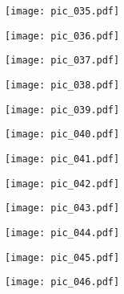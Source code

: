\documentclass[12pt,a4paper]{article}
\begin{document}
\newpage
\bigtitle
\begin{figure}[H]
\texttt{[image: pic\_035.pdf]}
\end{figure}

\newpage
\bigtitle
\begin{figure}[H]
\texttt{[image: pic\_036.pdf]}
\end{figure}

\newpage
\bigtitle
\begin{figure}[H]
\texttt{[image: pic\_037.pdf]}
\end{figure}

\newpage
\bigtitle
\begin{figure}[H]
\texttt{[image: pic\_038.pdf]}
\end{figure}

\newpage
\bigtitle
\begin{figure}[H]
\texttt{[image: pic\_039.pdf]}
\end{figure}

\newpage
\bigtitle
\begin{figure}[H]
\texttt{[image: pic\_040.pdf]}
\end{figure}

\newpage
\bigtitle
\begin{figure}[H]
\texttt{[image: pic\_041.pdf]}
\end{figure}

\newpage
\bigtitle
\begin{figure}[H]
\texttt{[image: pic\_042.pdf]}
\end{figure}

\newpage
\bigtitle
\begin{figure}[H]
\texttt{[image: pic\_043.pdf]}
\end{figure}

\newpage
\bigtitle
\begin{figure}[H]
\texttt{[image: pic\_044.pdf]}
\end{figure}

\newpage
\bigtitle
\begin{figure}[H]
\texttt{[image: pic\_045.pdf]}
\end{figure}

\newpage
\bigtitle
\begin{figure}[H]
\texttt{[image: pic\_046.pdf]}
\end{figure}
\end{document}
